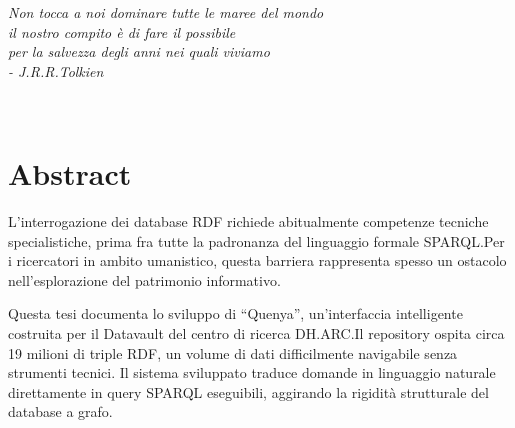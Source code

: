 \documentclass[12pt,a4paper,oneside]{book}
\begin{document}

\restoregeometry\newpage





\topmargin=6.5cm
\begin{flushright}
\emph{
\LARGE{Non tocca a noi dominare tutte le maree del mondo}\\
\LARGE{il nostro compito è di fare il possibile}\\
\LARGE{per la salvezza degli anni nei quali viviamo}\\
\vspace{5mm}
\LARGE{- J.R.R.Tolkien} \\
}
\end{flushright}



\newpage~\newpage
\chapter*{Abstract}\label{chap:abstract}
L'interrogazione dei database RDF richiede abitualmente competenze tecniche specialistiche, prima fra tutte la padronanza del linguaggio formale SPARQL.\@ Per i ricercatori in ambito umanistico, questa barriera rappresenta spesso un ostacolo nell'esplorazione del patrimonio informativo.

Questa tesi documenta lo sviluppo di ``Quenya'', un'interfaccia intelligente costruita per il Datavault del centro di ricerca DH.ARC.\@ Il repository ospita circa 19 milioni di triple RDF, un volume di dati difficilmente navigabile senza strumenti tecnici. Il sistema sviluppato traduce domande in linguaggio naturale direttamente in query SPARQL eseguibili, aggirando la rigidità strutturale del database a grafo.
\end{document}
